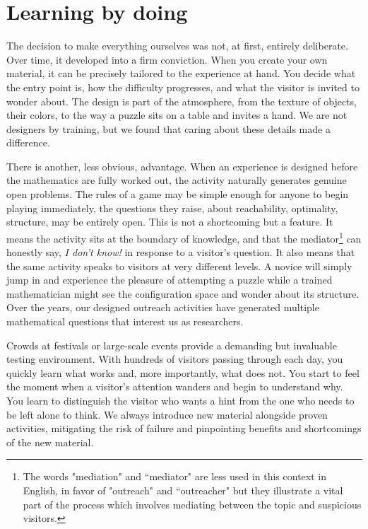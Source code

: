 \documentclass{notices}
\begin{document}
\section*{Learning by doing}

The decision to make everything ourselves was not, at first, entirely deliberate. Over time, it developed into a firm conviction. When you create your own material, it can be precisely tailored to the experience at hand. You decide what the entry point is, how the difficulty progresses, and what the visitor is invited to wonder about. The design is part of the  atmosphere, from the texture of objects, their colors, to the way a puzzle sits on a table and invites a hand. We are not designers by training, but we found that caring about these details made a difference.

There is another, less obvious, advantage. When an experience is designed before the mathematics are fully worked out, the activity naturally generates genuine open problems. The rules of a game may be simple enough for anyone to begin playing immediately, the questions they raise, about reachability, optimality, structure, may be entirely open.
This is not a shortcoming but a feature. It means the activity sits at the boundary of knowledge, and that the mediator\footnote{The words "mediation" and ``mediator" are less used in this context in English, in favor of "outreach" and ``outreacher" but they illustrate a vital part of the process which involves mediating between the topic and suspicious visitors.} can honestly say, \textit{I don't know!} in response to a visitor's question. It also means that the same activity speaks to visitors at very different levels. A novice will simply jump in and experience the pleasure of attempting a puzzle while a trained mathematician might see the configuration space and wonder about its structure. Over the years, our designed outreach activities have generated multiple mathematical questions that interest us as researchers.

Crowds at festivals or large-scale events provide a demanding but invaluable testing environment. With hundreds of visitors passing through each day, you quickly learn what works and, more importantly, what does not. You start to feel the moment when a visitor's attention wanders and begin to understand why. You learn to distinguish the visitor who wants a hint from the one who needs to be left alone to think. We always introduce new material alongside proven activities, mitigating the risk of failure and pinpointing benefits and shortcomings of the new material.
\end{document}
